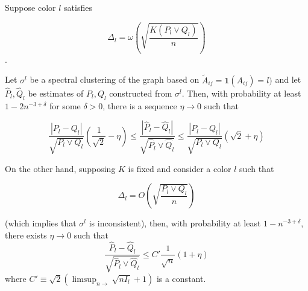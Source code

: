 \documentclass{article}
\begin{document}
\begin{proposition}
\label{prop:initial_guarantee}
Suppose color $l$ satisfies 

$$\Delta_l = \omega \left( \sqrt{ \frac{K (P_l \vee Q_l)}{n}} \right)$$. 

Let $\sigma^l$ be a spectral clustering of the graph based on $\tilde{A}_{ij} = \mathbf{1}(A_{ij}) = l)$ and let $\hat{P}_l, \hat{Q}_l$ be estimates of $P_l, Q_l$ constructed from $\sigma^l$. Then, with probability at least $1 - 2n^{-3+\delta}$ for some $\delta > 0$, there is a sequence $\eta \rightarrow 0$ such that

\[
\frac{ | P_l - Q_l |}{\sqrt{P_l \vee Q_l}} (\frac{1}{\sqrt{2}} - \eta) \leq \frac{ | \hat{P}_l - \hat{Q}_l| }{\sqrt{ \hat{P}_l \vee \hat{Q}_l }} \leq  
 \frac{ | P_l - Q_l | }{\sqrt{ P_l \vee Q_l}} (\sqrt{2} + \eta)
\]

On the other hand, supposing $K$ is fixed and consider a color $l$ such that 

$$\Delta_l = O \left( \sqrt{ \frac{P_l \vee Q_l}{n}} \right)$$ 

(which implies that $\sigma^l$ is inconsistent), then, with probability at least $1 - n^{-3+\delta}$, there exists $\eta \rightarrow 0$ such that 
\[
\frac{\hat{P}_l - \hat{Q}_l}{\sqrt{\hat{P}_l \vee \hat{Q}_l}} \leq  C' \frac{1}{\sqrt{n}} (1 + \eta) 
\]
where $C' \equiv \sqrt{2} (\limsup_{n \rightarrow} \sqrt{n I_l} + 1)$ is a constant. 
\end{proposition}
\end{document}
